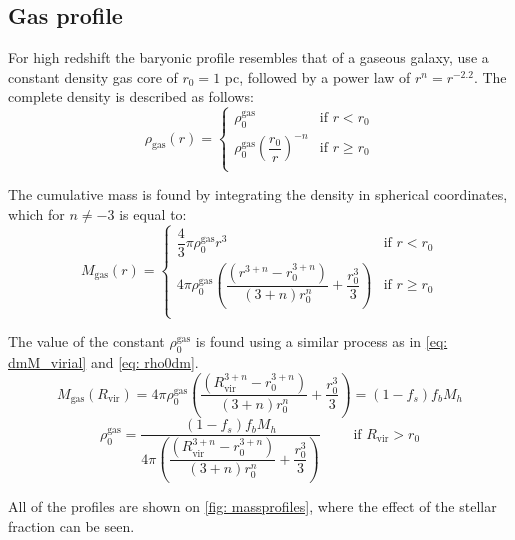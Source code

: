 		\subsection{Gas profile}
			For high redshift the baryonic profile resembles that of a gaseous galaxy, \citeauthor{choksi2017recoiling} use a constant density gas core of $r_0 = 1$ pc, followed by a power law of $r^n = r^{-2.2}$. The complete density is described as follows:
			\begin{equation}
				\rho_\text{gas}(r) = \left \{
					\begin{matrix}
					\rho_0^\text{gas} & \text{if $r < r_0$}\\
					\rho_0^\text{gas}\left(\dfrac{r_0}{r}\right)^{-n} & \text{if $r \geq r_0$}\\
					\end{matrix}
				\right.
			\end{equation}
			
			The cumulative mass is found by integrating the density in spherical coordinates, which for $n \neq -3$ is equal to:
			\begin{equation}
				M_\text{gas}(r) = \left \{
					\begin{matrix}
					\dfrac{4}{3}\pi\rho_0^\text{gas}r^3 & \text{if $r < r_0$} \\
					4\pi\rho_0^\text{gas}\left(\dfrac{\left(r^{3 + n} - r_0^{3 + n}\right)}{(3+n)r_0^{n}}  + \dfrac{r_0^3}{3}\right) & \text{if $r \geq r_0$} \\
					\end{matrix}
				\right.
			\end{equation}
			
			The value of the constant $\rho_0^\text{gas}$ is found using a similar process as in \autoref{eq: dmM_virial} and \ref{eq: rho0dm}.
			\begin{equation}
				M_\text{gas}(R_\text{vir}) = 4\pi\rho_0^\text{gas}\left(\dfrac{\left(R_\text{vir}^{3 + n} - r_0^{3 + n}\right)}{(3+n)r_0^{n}} + \dfrac{r_0^3}{3}\right) = (1 - f_s) f_bM_h
			\end{equation}
			\begin{equation}
				\rho_0^\text{gas} = \dfrac{(1 - f_s) f_bM_h}{4\pi \left(\dfrac{\left(R_\text{vir}^{3 + n} - r_0^{3 + n}\right)}{(3+n)r_0^{n}} + \dfrac{r_0^3}{3}\right)} \qquad \text{ if $R_\text{vir} > r_0$}
			\end{equation}
			
			All of the profiles are shown on \autoref{fig: massprofiles}, where the effect of the stellar fraction can be seen.			
